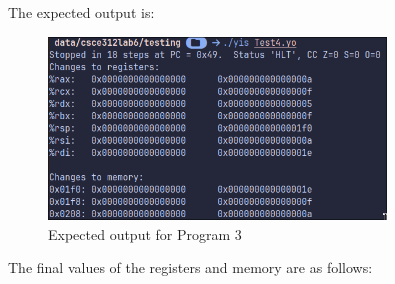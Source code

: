 \documentclass{article}
\begin{document}
The expected output is:

\begin{figure}[H]
    \centering
    \includegraphics[width=0.8\textwidth]{./images/test4_out.png}
    \caption{Expected output for Program 3}
\end{figure}

The final values of the registers and memory are as follows:
\end{document}
